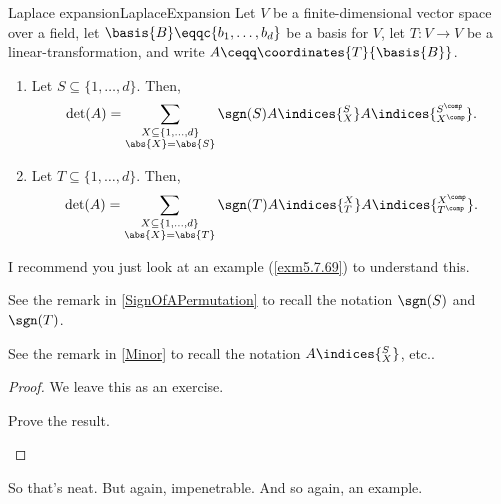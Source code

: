 \begin{thm}{Laplace expansion}{LaplaceExpansion}
	Let $V$ be a finite-dimensional vector space over a field, let $\basis{B}\eqqc \{ b_1,\ldots ,b_d\}$ be a basis for $V$, let $T\colon V\rightarrow V$ be a linear-transformation, and write $A\ceqq \coordinates{T}{\basis{B}}$.
	\begin{enumerate}
		\item Let $S\subseteq \{ 1,\ldots ,d\}$.  Then,
		\begin{equation}
			\det (A)=\sum _{\substack{X\subseteq \{ 1,\ldots ,d\} \\ \abs{X}=\abs{S}}}\sgn (S)A\indices{^S_X}A\indices{^{S^{\comp}}_{X^{\comp}}}.
		\end{equation}
		\item Let $T\subseteq \{ 1,\ldots ,d\}$.  Then,
		\begin{equation}
			\det (A)=\sum _{\substack{X\subseteq \{ 1,\ldots ,d\} \\ \abs{X}=\abs{T}}}\sgn (T)A\indices{^X_T}A\indices{^{X^{\comp}}_{T^{\comp}}}.
		\end{equation}
	\end{enumerate}
	\begin{rmk}
		I recommend you just look at an example (\cref{exm5.7.69}) to understand this.
	\end{rmk}
	\begin{rmk}
		See the remark in \cref{SignOfAPermutation} to recall the notation $\sgn (S)$ and $\sgn (T)$.
	\end{rmk}
	\begin{rmk}
		See the remark in \cref{Minor} to recall the notation $A\indices{^S_X}$, etc..
	\end{rmk}
	\begin{proof}
		We leave this as an exercise.
		\begin{exr}[breakable=false]{}{}
			Prove the result.
		\end{exr}
	\end{proof}
\end{thm}
So that's neat.  But again, impenetrable.  And so again, an example.
